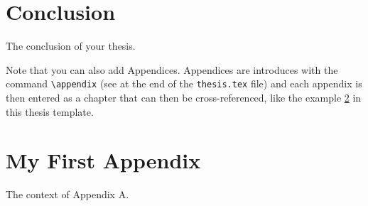 \documentclass[11pt,twoside,openright]{report}
\begin{document}
\chapter{Conclusion}
\label{ch:conclusion}

The conclusion of your thesis.

Note that you can also add Appendices. 
Appendices are introduces with the command \verb|\appendix| (see at the end of the \verb|thesis.tex| file) and each appendix is then entered as a chapter that can then be cross-referenced, like the example \cref{app:AppendixA} in this thesis template.\cite{Adan2018Scan-to-BIMComponents}





\renewcommand{\bibname}{References}








\appendix

\chapter{My First Appendix}
\label{app:AppendixA}

The context of Appendix A.
\end{document}

